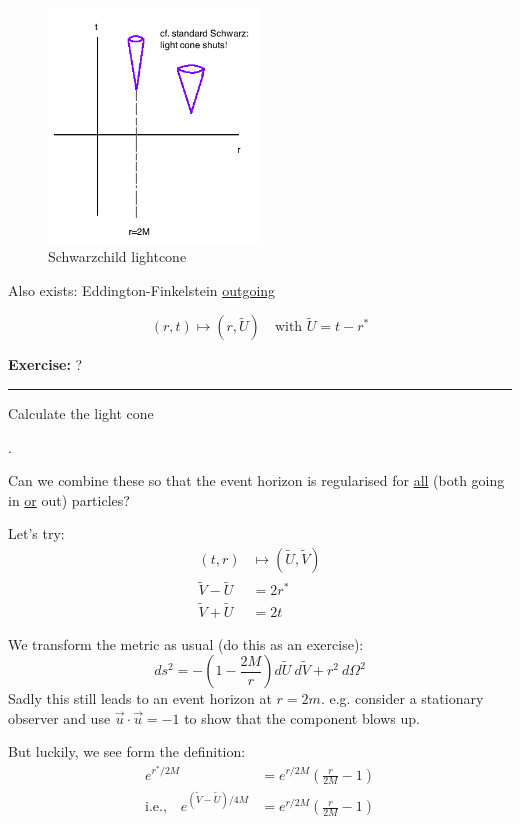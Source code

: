 \documentclass[a4paper]{article} %
\newcommand{\exercise}[2]
{
\begin{framed}
\textbf{Exercise:} #1 \\\hrule
#2
\end{framed}
}
\renewcommand{\tilde}{\widetilde}
\begin{document}
\begin{figure}[h]
\centering
\includegraphics[width=0.5\textwidth]{images/schwarz-lightcone.png}
\caption{Schwarzchild lightcone}
\end{figure}


Also exists: Eddington-Finkelstein \underline{outgoing}

\begin{equation}
(r,t)\mapsto (r,\tilde{U})\quad\text{with }\tilde{U}=t-r^{\ast}
\end{equation}
\exercise{?}{Calculate the light cone}.

\HRule

Can we combine these so that the event horizon is regularised for \underline{all} (both going in \underline{or} out) particles?

Let's try:
\begin{align}
(t,r) &\mapsto (\tilde{U},\tilde{V})\\
\tilde{V}-\tilde{U}&=2r^{\ast}\\
\tilde{V}+\tilde{U}&= 2t
\end{align}

We transform the metric as usual (do this as an exercise):
\begin{equation}
ds^2 = -\left(1-\frac{2M}{r}\right) d\tilde{U}~d\tilde{V}+r^2~d\Omega^2
\end{equation}
Sadly this still leads to an event horizon at $r=2m$. e.g. consider a stationary observer and use $\vec{u}\cdot \vec{u}=-1$ to show that the component blows up.

But luckily, we see form the definition:
\begin{align}
e^{r^{\ast}/2M}&=e^{r/2M}\left(\frac{r}{2M}-1\right)\\
\text{i.e.,}\quad e^{(\tilde{V}-\tilde{U})/4M}&= e^{r/2M}\left(\frac{r}{2M}-1\right)
\end{align}
\end{document}
